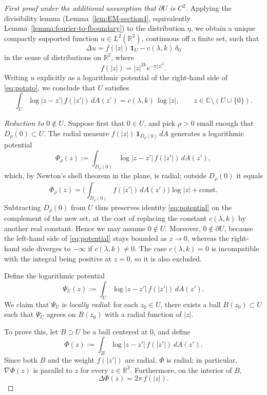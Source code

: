 \documentclass[a4paper,11pt,reqno]{amsart}
\numberwithin{equation}{section}
\theoremstyle{plain} %
\theoremstyle{definition} %
\theoremstyle{remark}
\newcommand{\R}{\mathbb{R}}
\newcommand{\C}{\mathbb{C}}
\begin{document}
\begin{proof}[First proof under the additional assumption that $\partial U$ is $C^2$]
Applying the divisibility lemma (Lemma~\ref{lem:EM-section4}, equivalently
Lemma~\ref{lemma:fourier-to-fboundary}) to the distribution $\eta$, we
obtain a unique compactly supported function $u\in L^2(\R^2)$, continuous
off a finite set, such that
\begin{equation}\label{eq:potato}
\Delta u=f(|z|)\,\mathbf{1}_U-c(\lambda,k)\,\delta_0
\end{equation}
in the sense of distributions on $\R^2$, where
\[
f(|z|)=|z|^{2k}e^{-\pi |z|^2}.
\]
Writing $u$ explicitly as a logarithmic potential of the right-hand side
of \eqref{eq:potato}, we conclude that $U$ satisfies
\begin{equation}\label{eq:potential}
\int_U \log|z-z'|\, f(|z'|)\,dA(z')
=c(\lambda,k)\,\log|z|,
\qquad z\in \C\setminus (U\cup\{0\}).
\end{equation}

\medskip

\noindent\emph{Reduction to $0\notin U$.}\quad
Suppose first that $0\in U$, and pick $\rho>0$ small enough that
$\overline{D_\rho(0)}\subset U$. The radial measure
$f(|z|)\,\mathbf{1}_{D_\rho(0)}\,dA$ generates a logarithmic potential
\[
\Phi_\rho(z):=\int_{D_\rho(0)} \log|z-z'|\, f(|z'|)\,dA(z'),
\]
which, by Newton's shell theorem in the plane, is radial; outside
$D_\rho(0)$ it equals
\[
\Phi_\rho(z)=\Big(\int_{D_\rho(0)}f(|z'|)\,dA(z')\Big)\log|z|+\text{const}.
\]
Subtracting $D_\rho(0)$ from $U$ thus preserves identity
\eqref{eq:potential} on the complement of the new set, at the cost of
replacing the constant $c(\lambda,k)$ by another real constant. Hence we
may assume $0\notin U$. Moreover, $0\notin \partial U$, because the
left-hand side of \eqref{eq:potential} stays bounded as $z\to 0$, whereas
the right-hand side diverges to $-\infty$ if $c(\lambda,k)\neq 0$.
The case $c(\lambda,k)=0$ is incompatible with the integral being
positive at $z=0$, so it is also excluded.

\medskip

Define the logarithmic potential
\[
\Psi_U(z):=\int_U \log|z-z'|\, f(|z'|)\,dA(z').
\]
We claim that $\Psi_U$ is \emph{locally radial}: for each $z_0\in U$,
there exists a ball $B(z_0)\subset U$ such that $\Psi_U$ agrees on
$B(z_0)$ with a radial function of $|z|$.

To prove this, let $B\supset U$ be a ball centered at $0$, and define
\[
\Phi(z):=\int_B \log|z-z'|\, f(|z'|)\,dA(z').
\]
Since both $B$ and the weight $f(|z'|)$ are radial, $\Phi$ is radial; in
particular, $\nabla \Phi(z)$ is parallel to $z$ for every $z\in \R^2$.
Furthermore, on the interior of $B$,
\[
\Delta \Phi(z)=2\pi\, f(|z|).
\]


\end{proof}
\end{document}
